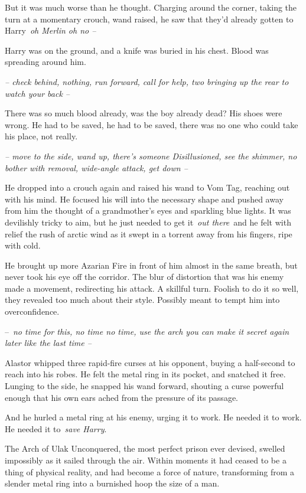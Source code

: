 But it was much worse than he thought. Charging around the corner,
taking the turn at a momentary crouch, wand raised, he saw that they'd
already gotten to Harry~\emph{oh Merlin oh no --}

Harry was on the ground, and a knife was buried in his chest. Blood was
spreading around him.

\emph{-- check behind, nothing, run forward, call for help, two bringing
up the rear to watch your back --}

There was so much blood already, was the boy already dead? His shoes
were wrong. He had to be saved, he had to be saved, there was no one who
could take his place, not really.

\emph{-- move to the side, wand up, there's someone Disillusioned, see
the shimmer, no bother with removal, wide-angle attack, get down --}

He dropped into a crouch again and raised his wand to Vom Tag, reaching
out with his mind. He focused his will into the necessary shape and
pushed away from him the thought of a grandmother's eyes and sparkling
blue lights. It was devilishly tricky to aim, but he just needed to get
it~\emph{out there}~and he felt with relief the rush of arctic wind as
it swept in a torrent away from his fingers, ripe with cold.

He brought up more Azarian Fire in front of him almost in the same
breath, but never took his eye off the corridor. The blur of distortion
that was his enemy made a movement, redirecting his attack. A skillful
turn. Foolish to do it so well, they revealed too much about their
style. Possibly meant to tempt him into overconfidence.

--~\emph{no time for this, no time no time, use the arch you can make it
secret again later like the last time --}

Alastor whipped three rapid-fire curses at his opponent, buying a
half-second to reach into his robes. He felt the metal ring in its
pocket, and snatched it free. Lunging to the side, he snapped his wand
forward, shouting a curse powerful enough that his own ears ached from
the pressure of its passage.

And he hurled a metal ring at his enemy, urging it to work. He needed it
to work. He needed it to~\emph{save Harry}.

The Arch of Ulak Unconquered, the most perfect prison ever devised,
swelled impossibly as it sailed through the air. Within moments it had
ceased to be a thing of physical reality, and had become a force of
nature, transforming from a slender metal ring into a burnished hoop the
size of a man.

